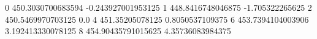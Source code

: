 0 450.3030700683594 -0.243927001953125
1 448.8416748046875 -1.705322265625
2 450.5469970703125 0.0
4 451.35205078125 0.8050537109375
6 453.7394104003906 3.192413330078125
8 454.90435791015625 4.35736083984375
